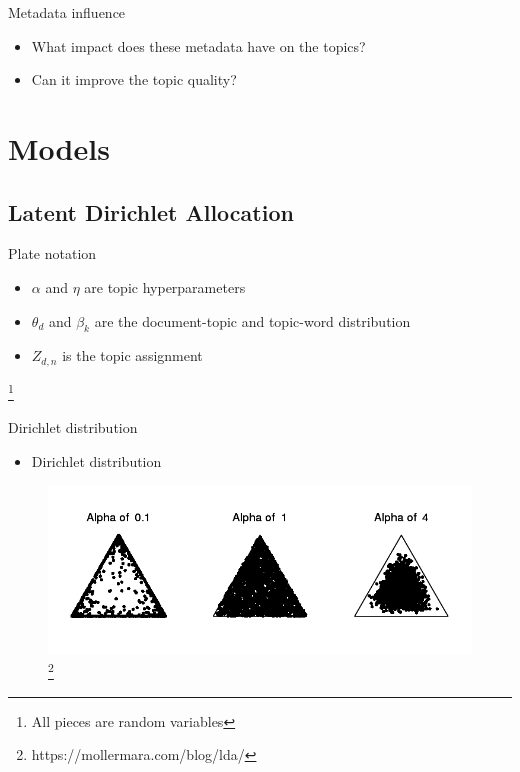 \begin{frame}{\insertsection}{Metadata influence}
	\begin{itemize}
		\item What impact does these metadata have on the topics?
		\item Can it improve the topic quality?
	\end{itemize}
\end{frame}

\section{Models}

\subsection{Latent Dirichlet Allocation}

\begin{frame}{\insertsubsection}{Plate notation}
	\begin{figure}
		\centering
		\resizebox{\textwidth}{!}{%
			
		}
	\end{figure}
	\begin{itemize}
		\item $\alpha$ and $\eta$ are topic hyperparameters
		\item $\theta_d$ and $\beta_k$ are the document-topic and topic-word distribution
		\item $Z_{d,n}$ is the topic assignment 
	\end{itemize}
	\let\thefootnote\relax\footnote{\tiny{All pieces are random variables}}
\end{frame}


\begin{frame}{\insertsubsection}{Dirichlet distribution}
	\begin{itemize}
		\item Dirichlet distribution
	\end{itemize}
	\begin{figure}
		\includegraphics[width=\textwidth]{figures/dirich.png}
		\let\thefootnote\relax\footnote{\tiny{https://mollermara.com/blog/lda/}}
	\end{figure}
\end{frame}

